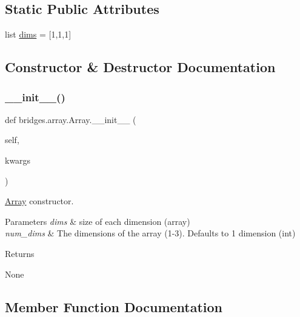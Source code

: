 \subsection*{Static Public Attributes}
\begin{DoxyCompactItemize}
\item 
list \hyperlink{classbridges_1_1array_1_1_array_a69f2c673a6077e203b3e916dd73cd243}{dims} = \mbox{[}1,1,1\mbox{]}
\end{DoxyCompactItemize}


\subsection{Constructor \& Destructor Documentation}
\mbox{\label{classbridges_1_1array_1_1_array_ac772cbf7ad482b235e30929c8e1063a4}} 
\subsubsection{\texorpdfstring{\+\_\+\+\_\+init\+\_\+\+\_\+()}{\_\_init\_\_()}}
{\footnotesize\ttfamily def bridges.\+array.\+Array.\+\_\+\+\_\+init\+\_\+\+\_\+ (\begin{DoxyParamCaption}\item[{}]{self,  }\item[{}]{kwargs }\end{DoxyParamCaption})}



\hyperlink{classbridges_1_1array_1_1_array}{Array} constructor. 


\begin{DoxyParams}{Parameters}
{\em dims} & size of each dimension (array) \\
\hline
{\em num\+\_\+dims} & The dimensions of the array (1-\/3). Defaults to 1 dimension (int) \\
\hline
\end{DoxyParams}
\begin{DoxyReturn}{Returns}


None 
\end{DoxyReturn}


\subsection{Member Function Documentation}
\mbox{\label{classbridges_1_1array_1_1_array_ad97d5a2cb4bffa4a6bcdb15a3ece0974}} 
